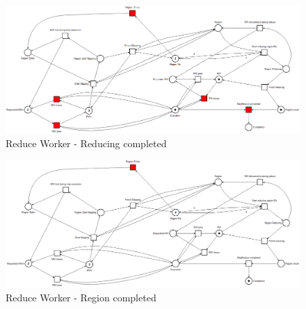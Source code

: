 \begin{figure}[!ht]
    \centering
    \includegraphics[width=\linewidth]{document/chapters/chapter_6/images/master_petri_net_7.png}
    \caption{Reduce Worker - Reducing completed}
    \label{fig:master_petri_net_7}
\end{figure}

\begin{figure}[!ht]
    \centering
    \includegraphics[width=\linewidth]{document/chapters/chapter_6/images/master_petri_net_8.png}
    \caption{Reduce Worker - Region completed}
    \label{fig:master_petri_net_8}
\end{figure}